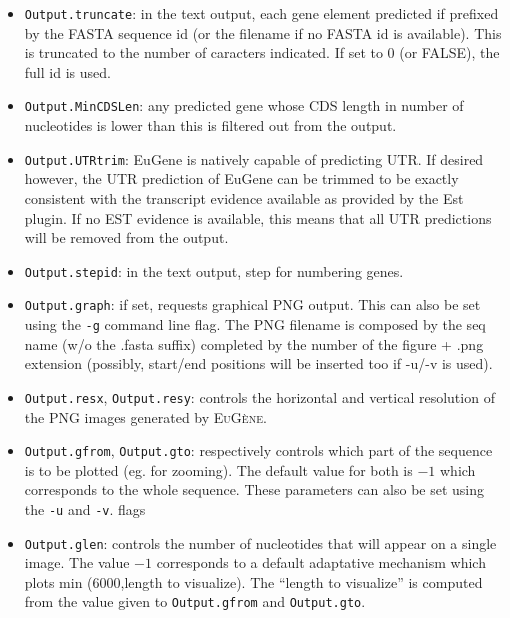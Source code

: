 \documentclass[a4paper,titlepage]{report}
\newcommand{\EuGene}{\textsc{EuG\`ene}}
\begin{document}
\begin{itemize}
\item \texttt{Output.truncate}: in the text output, each gene element
  predicted if prefixed by the FASTA sequence id (or the filename if
  no FASTA id is available). This is truncated to the number of
  caracters indicated. If set to 0 (or FALSE), the full id is used.

\item \texttt{Output.MinCDSLen}: any predicted gene whose CDS length
  in number of nucleotides is lower than this is filtered out from the
  output.

\item \texttt{Output.UTRtrim}: EuGene is natively capable of
  predicting UTR. If desired however, the UTR prediction of EuGene can
  be trimmed to be exactly consistent with the transcript evidence
  available as provided by the Est plugin. If no EST evidence is
  available, this means that all UTR predictions will be removed from
  the output.

\item \texttt{Output.stepid}: in the text output, step for numbering genes.

\item \texttt{Output.graph}: if set, requests graphical PNG output.
  This can also be set using the \texttt{-g} command line flag. 
  The PNG filename is composed by the seq name (w/o the .fasta suffix) completed by
  the number of the figure + .png extension (possibly,
  start/end positions will be inserted too if -u/-v is used).
  
\item \texttt{Output.resx}, \texttt{Output.resy}: controls the
  horizontal and vertical resolution of the PNG images generated by
  \EuGene. 
  
\item \texttt{Output.gfrom}, \texttt{Output.gto}: respectively
  controls which part of the sequence is to be plotted (eg. for
  zooming). The default value for both is $-1$ which corresponds to
  the whole sequence. These parameters can also be set using the
  \texttt{-u} and \texttt{-v}. flags 

\item \texttt{Output.glen}: controls the number of nucleotides that
  will appear on a single image. The value $-1$ corresponds to a
  default adaptative mechanism which plots min (6000,length to
  visualize). The ``length to visualize'' is computed from the value
  given to \texttt{Output.gfrom} and \texttt{Output.gto}.
  

\end{itemize}
\end{document}
